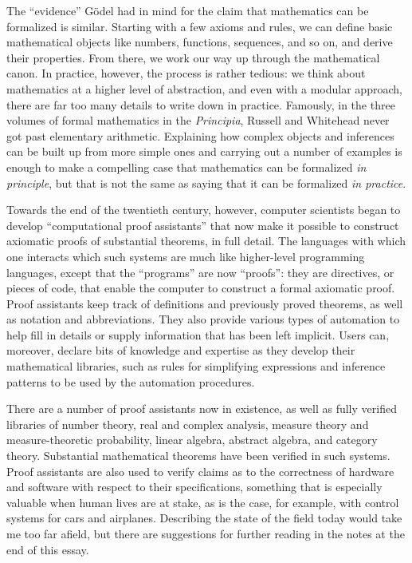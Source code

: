 \documentclass[11pt]{article}
\begin{document}
The ``evidence'' G\"odel had in mind for the claim that mathematics can be formalized is similar. Starting with a few axioms and rules, we can define basic mathematical objects like numbers, functions, sequences, and so on, and derive their properties. From there, we work our way up through the mathematical canon. In practice, however, the process is rather tedious: we think about mathematics at a higher level of abstraction, and even with a modular approach, there are far too many details to write down in practice. Famously, in the three volumes of formal mathematics in the \emph{Principia}, Russell and Whitehead never got past elementary arithmetic. Explaining how complex objects and inferences can be built up from more simple ones and carrying out a number of examples is enough to make a compelling case that mathematics can be formalized \emph{in principle}, but that is not the same as saying that it can be formalized \emph{in practice}.

Towards the end of the twentieth century, however, computer scientists began to develop ``computational proof assistants'' that now make it possible to construct axiomatic proofs of substantial theorems, in full detail. The languages with which one interacts which such systems are much like higher-level programming languages, except that the ``programs'' are now ``proofs'': they are directives, or pieces of code, that enable the computer to construct a formal axiomatic proof. Proof assistants keep track of definitions and previously proved theorems, as well as notation and abbreviations. They also provide various types of automation to help fill in details or supply information that has been left implicit. Users can, moreover, declare bits of knowledge and expertise as they develop their mathematical libraries, such as rules for simplifying expressions and inference patterns to be used by the automation procedures.

There are a number of proof assistants now in existence, as well as fully verified libraries of number theory, real and complex analysis, measure theory and measure-theoretic probability, linear algebra, abstract algebra, and category theory. Substantial mathematical theorems have been verified in such systems. Proof assistants are also used to verify claims as to the correctness of hardware and software with respect to their specifications, something that is especially valuable when human lives are at stake, as is the case, for example, with control systems for cars and airplanes. Describing the state of the field today would take me too far afield, but there are suggestions for further reading in the notes at the end of this essay.
\end{document}
